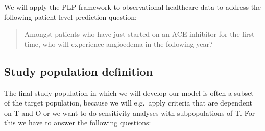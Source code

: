\documentclass[11pt]{book}
\begin{document}
We will apply the PLP framework to observational healthcare data to
address the following patient-level prediction question:

\begin{quote}
Amongst patients who have just started on an ACE inhibitor for the first
time, who will experience angioedema in the following year?
\end{quote}

\subsection{Study population
definition}\label{study-population-definition}

The final study population in which we will develop our model is often a
subset of the target population, because we will e.g.~apply criteria
that are dependent on T and O or we want to do sensitivity analyses with
subpopulations of T. For this we have to answer the following questions:
\end{document}
